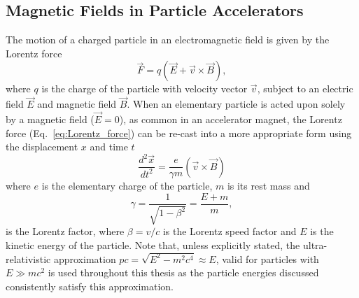 \documentclass[../main.tex]{subfiles}
\begin{document}
\subsection{Magnetic Fields in Particle Accelerators}

The motion of a charged particle in an electromagnetic field is given by the Lorentz force 
\begin{equation}
\overrightarrow{F} = q\left(\overrightarrow{E}+\overrightarrow{v}\times\overrightarrow{B}\right),
\label{eq:Lorentz_force}    
\end{equation}
where $q$ is the charge of the particle with velocity vector $\overrightarrow{v}$, subject to an electric field $\overrightarrow{E}$ and magnetic field $\overrightarrow{B}$. When an elementary particle is acted upon solely by a magnetic field ($\overrightarrow{E}=0$), as common in an accelerator magnet, the Lorentz force (Eq.~\ref{eq:Lorentz_force}) can be re-cast into a more appropriate form using the displacement $x$ and time $t$
\begin{equation}
\frac{d^{2}\overrightarrow{x}}{dt^{2}} = \frac{e}{\gamma m}\left(\overrightarrow{v}\times\overrightarrow{B}\right)
\label{eq:displacement_Lorentz}    
\end{equation}
where $e$ is the elementary charge of the particle, $m$ is its rest mass and
\begin{equation}
\gamma = \frac{1}{\sqrt{1-\beta^{2}}} = \frac{E+m}{m},
\label{eq:Lorentz_factor}    
\end{equation}
is the Lorentz factor, where $\beta = v/c$ is the Lorentz speed factor and $E$ is the kinetic energy of the particle. Note that, unless explicitly stated, the ultra-relativistic approximation $pc = \sqrt{E^{2}-m^{2}c^{4}} \approx E$, valid for particles with $E \gg mc^{2}$ is used throughout this thesis as the particle energies discussed consistently satisfy this approximation.   
\end{document}
